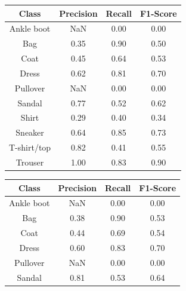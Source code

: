 \begin{table}[H]
    \centering
    \begin{minipage}{0.32\textwidth}
        \centering
        \begin{adjustbox}{max width=1\textwidth}
            \begin{tabular}{|c|c|c|c|}
                \hline
                \textbf{Class} & \textbf{Precision} & \textbf{Recall} & \textbf{F1-Score} \\ \hline
                Ankle boot & NaN & 0.00 & 0.00 \\ 
                Bag & 0.35 & 0.90 & 0.50 \\
                Coat & 0.45 & 0.64 & 0.53 \\ 
                Dress & 0.62 & 0.81 & 0.70 \\ 
                Pullover & NaN & 0.00 & 0.00 \\ 
                Sandal & 0.77 & 0.52 & 0.62 \\ 
                Shirt & 0.29 & 0.40 & 0.34 \\ 
                Sneaker & 0.64 & 0.85 & 0.73 \\ 
                T-shirt/top & 0.82 & 0.41 & 0.55 \\ 
                Trouser & 1.00 & 0.83 & 0.90 \\ \hline
            \end{tabular}
        \end{adjustbox}
    \end{minipage}
    \hfill
    \begin{minipage}{0.32\textwidth}
        \centering
        \begin{adjustbox}{max width=1\textwidth}
            \begin{tabular}{|c|c|c|c|}
                \hline
                \textbf{Class} & \textbf{Precision} & \textbf{Recall} & \textbf{F1-Score} \\ \hline
                Ankle boot & NaN & 0.00 & 0.00 \\ 
                Bag & 0.38 & 0.90 & 0.53 \\ 
                Coat & 0.44 & 0.69 & 0.54 \\ 
                Dress & 0.60 & 0.83 & 0.70 \\ 
                Pullover & NaN & 0.00 & 0.00 \\ 
                Sandal & 0.81 & 0.53 & 0.64 \\ 

\end{tabular}
\end{adjustbox}
\end{minipage}
\end{table}
